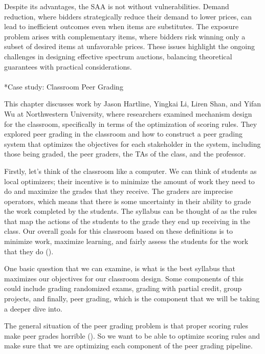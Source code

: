 \documentclass[
  letterpaper,
  numbers=noenddot,
  DIV=11]{scrreprt}
\makeatletter
\let\oldparagraph\paragraph
\renewcommand{\paragraph}{
    \@ifstar
      \xxxParagraphStar
      \xxxParagraphNoStar
  }
\newcommand{\xxxParagraphStar}[1]{\oldparagraph*{#1}\mbox{}}
\newcommand{\xxxParagraphNoStar}[1]{\oldparagraph{#1}\mbox{}}
\theoremstyle{plain}
\theoremstyle{definition}
\theoremstyle{plain}
\theoremstyle{remark}
\makeatother
\begin{document}
Despite its advantages, the SAA is not without vulnerabilities. Demand
reduction, where bidders strategically reduce their demand to lower
prices, can lead to inefficient outcomes even when items are
substitutes. The exposure problem arises with complementary items, where
bidders risk winning only a subset of desired items at unfavorable
prices. These issues highlight the ongoing challenges in designing
effective spectrum auctions, balancing theoretical guarantees with
practical considerations.

\paragraph*{Case study: Classroom Peer
Grading}\label{case-study-classroom-peer-grading}

This chapter discusses work by Jason Hartline, Yingkai Li, Liren Shan,
and Yifan Wu at Northwestern University, where researchers examined
mechanism design for the classroom, specifically in terms of the
optimization of scoring rules. They explored peer grading in the
classroom and how to construct a peer grading system that optimizes the
objectives for each stakeholder in the system, including those being
graded, the peer graders, the TAs of the class, and the professor.

Firstly, let's think of the classroom like a computer. We can think of
students as local optimizers; their incentive is to minimize the amount
of work they need to do and maximize the grades that they receive. The
graders are imprecise operators, which means that there is some
uncertainty in their ability to grade the work completed by the
students. The syllabus can be thought of as the rules that map the
actions of the students to the grade they end up receiving in the class.
Our overall goals for this classroom based on these definitions is to
minimize work, maximize learning, and fairly assess the students for the
work that they do ().

One basic question that we can examine, is what is the best syllabus
that maximizes our objectives for our classroom design. Some components
of this could include grading randomized exams, grading with partial
credit, group projects, and finally, peer grading, which is the
component that we will be taking a deeper dive into.

The general situation of the peer grading problem is that proper scoring
rules make peer grades horrible (). So we want to be able to optimize scoring rules and make
sure that we are optimizing each component of the peer grading pipeline.
\end{document}
